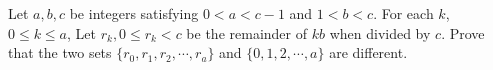 Let $ a, b, c$ be integers satisfying $ 0 < a < c - 1$ and $ 1 < b < c$. For each $ k$, $ 0\leq k \leq a$, Let $ r_k,0 \leq r_k < c$ be the remainder of $ kb$ when divided by $ c$. Prove that the two sets $ \{r_0, r_1, r_2, \cdots , r_a\}$ and $ \{0, 1, 2, \cdots , a\}$ are different.